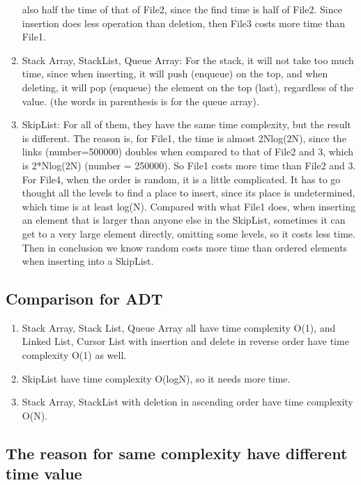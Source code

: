\documentclass[]{article}
\begin{document}
\begin{enumerate}
  also half the time of that of File2, since the find time is half of
  File2. Since insertion does less operation than deletion, then File3
  costs more time than File1.
\item
  Stack Array, StackList, Queue Array: For the stack, it will not take
  too much time, since when inserting, it will push (enqueue) on the
  top, and when deleting, it will pop (enqueue) the element on the top
  (last), regardless of the value. (the words in parenthesis is for the
  queue array).
\item
  SkipList: For all of them, they have the same time complexity, but the
  result is different. The reason is, for File1, the time is almost
  2Nlog(2N), since the links (number=500000) doubles when compared to
  that of File2 and 3, which is 2*Nlog(2N) (number = 250000). So File1
  costs more time than File2 and 3. For File4, when the order is random,
  it is a little complicated. It has to go thought all the levels to
  find a place to insert, since its place is undetermined, which time is
  at least log(N). Compared with what File1 does, when inserting an
  element that is larger than anyone else in the SkipList, sometimes it
  can get to a very large element directly, omitting some levels, so it
  costs less time. Then in conclusion we know random costs more time
  than ordered elements when inserting into a SkipList.
\end{enumerate}

\subsection{Comparison for ADT}\label{comparison-for-adt}

\begin{enumerate}
\def\labelenumi{\arabic{enumi}.}
\item
  Stack Array, Stack List, Queue Array all have time complexity O(1),
  and Linked List, Cursor List with insertion and delete in reverse
  order have time complexity O(1) as well.
\item
  SkipList have time complexity O(logN), so it needs more time.
\item
  Stack Array, StackList with deletion in ascending order have time
  complexity O(N).
\end{enumerate}

\subsection{The reason for same complexity have different time
value}\label{the-reason-for-same-complexity-have-different-time-value}
\end{document}
